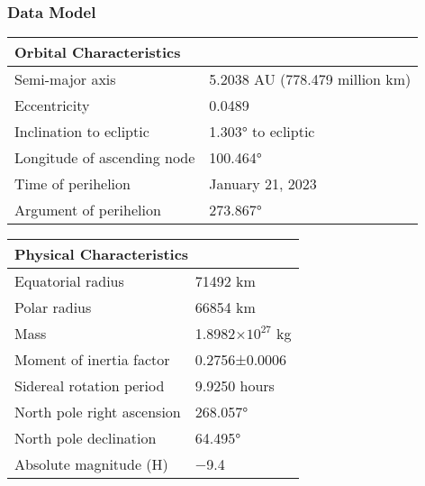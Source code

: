 
\subsubsection{Data Model}
\begin{tabular}{ | l | l |}
\hline
\multicolumn{2}{|l|}{Orbital Characteristics}  \\
\hline
Semi-major axis&5.2038 AU (778.479 million km) \\
\hline
Eccentricity&0.0489  \\
\hline
Inclination to ecliptic&1.303° to ecliptic\\
\hline
Longitude of ascending node&100.464° \\
\hline
Time of perihelion&January 21, 2023 \\
\hline
Argument of perihelion&273.867° \\
\hline
\end{tabular}

\begin{tabular}{ | l | l |}
\hline
\multicolumn{2}{|l|}{Physical Characteristics}  \\
\hline
Equatorial radius&71492 km  \\
Polar radius&66854 km  \\
Mass&1.8982×$10^27$ kg  \\
Moment of inertia factor&0.2756±0.0006  \\
Sidereal rotation period&9.9250 hours  \\
North pole right ascension&268.057° \\
North pole declination&64.495° \\
Absolute magnitude (H)&−9.4 \\
\end{tabular}



